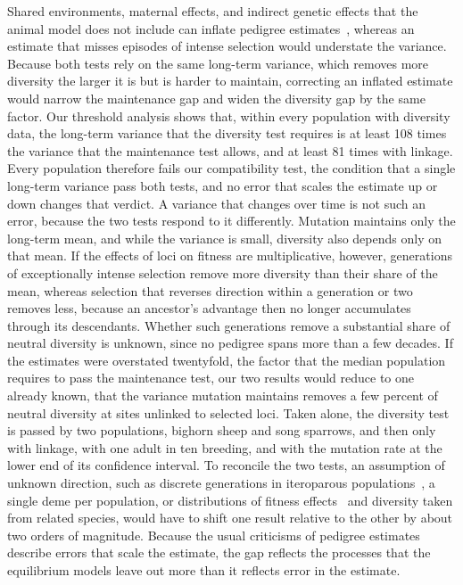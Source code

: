 \documentclass{article}
\begin{document}
Shared environments, maternal effects, and indirect genetic effects that the animal model does not include can inflate pedigree estimates~\cite{kruuk2007,stopher2012,baud2022,mawass2025}, whereas an estimate that misses episodes of intense selection would understate the variance. Because both tests rely on the same long-term variance, which removes more diversity the larger it is but is harder to maintain, correcting an inflated estimate would narrow the maintenance gap and widen the diversity gap by the same factor. Our threshold analysis shows that, within every population with diversity data, the long-term variance that the diversity test requires is at least 108 times the variance that the maintenance test allows, and at least 81 times with linkage. Every population therefore fails our compatibility test, the condition that a single long-term variance pass both tests, and no error that scales the estimate up or down changes that verdict. A variance that changes over time is not such an error, because the two tests respond to it differently. Mutation maintains only the long-term mean, and while the variance is small, diversity also depends only on that mean. If the effects of loci on fitness are multiplicative, however, generations of exceptionally intense selection remove more diversity than their share of the mean, whereas selection that reverses direction within a generation or two removes less, because an ancestor's advantage then no longer accumulates through its descendants. Whether such generations remove a substantial share of neutral diversity is unknown, since no pedigree spans more than a few decades. If the estimates were overstated twentyfold, the factor that the median population requires to pass the maintenance test, our two results would reduce to one already known, that the variance mutation maintains removes a few percent of neutral diversity at sites unlinked to selected loci. Taken alone, the diversity test is passed by two populations, bighorn sheep and song sparrows, and then only with linkage, with one adult in ten breeding, and with the mutation rate at the lower end of its confidence interval. To reconcile the two tests, an assumption of unknown direction, such as discrete generations in iteroparous populations~\cite{engen2005}, a single deme per population, or distributions of fitness effects~\cite{lin2026} and diversity taken from related species, would have to shift one result relative to the other by about two orders of magnitude. Because the usual criticisms of pedigree estimates describe errors that scale the estimate, the gap reflects the processes that the equilibrium models leave out more than it reflects error in the estimate.
\end{document}
